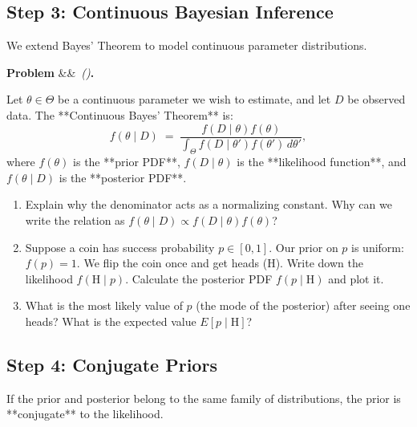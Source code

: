 \documentclass[12pt, a4paper]{article}
\newcounter{problem}
\newenvironment{problem}[1][]{%
  \refstepcounter{problem}%
  \par\vspace{6pt}%
  \noindent\textbf{\color{MidBlue}Problem \theproblem}%
  \ifx&#1&\else\ \textit{(#1)}\fi\textbf{.}\enskip
}{\par\vspace{4pt}}
\begin{document}
\subsection{Step 3: Continuous Bayesian Inference}

We extend Bayes' Theorem to model continuous parameter distributions.

\begin{problem}
\label{prob:continuous_bayes}
Let $\theta \in \Theta$ be a continuous parameter we wish to estimate, and let $D$ be observed data.
The **Continuous Bayes' Theorem** is:
\[
  f(\theta \mid D) \;=\; \frac{f(D \mid \theta) f(\theta)}{\int_\Theta f(D \mid \theta') f(\theta') \, d\theta'},
\]
where $f(\theta)$ is the **prior PDF**, $f(D \mid \theta)$ is the **likelihood function**, and $f(\theta \mid D)$ is the **posterior PDF**.
\begin{enumerate}[label=(\alph*), topsep=2pt]
  \item Explain why the denominator acts as a normalizing constant. Why can we write the relation as $f(\theta \mid D) \propto f(D \mid \theta) f(\theta)$?
  \item Suppose a coin has success probability $p \in [0, 1]$. Our prior on $p$ is uniform: $f(p) = 1$. We flip the coin once and get heads (H). Write down the likelihood $f(\text{H} \mid p)$. Calculate the posterior PDF $f(p \mid \text{H})$ and plot it.
  \item What is the most likely value of $p$ (the mode of the posterior) after seeing one heads? What is the expected value $E[p \mid \text{H}]$?
\end{enumerate}
\end{problem}

\subsection{Step 4: Conjugate Priors}

If the prior and posterior belong to the same family of distributions, the prior is **conjugate** to the likelihood.
\end{document}
